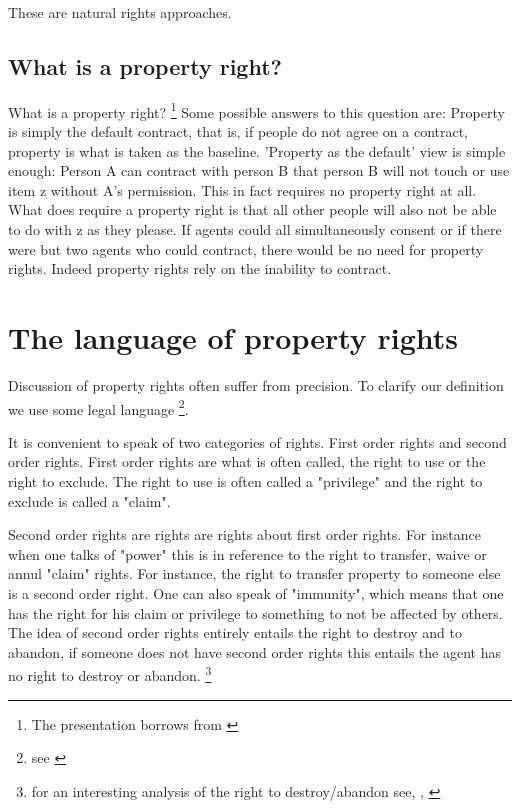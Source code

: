 \documentclass[12pt]{article}
\numberwithin{equation}{section}
\begin{document}
These are natural rights approaches. 

\newpage


\subsection{What is a property right?}

What is a property right? \footnote{The presentation borrows from \cite{Munzer1990}}
Some possible answers to this question are: Property is simply the default contract, that is, if people do not agree on a contract, property is what is taken as the baseline. 'Property as the default' view is simple enough: Person A can contract with person B that person B will not touch or use item z without A's permission. This in fact requires no property right at all. What does require a property right is that all other people will also not be able to do with z as they please. If agents could all simultaneously consent or if there were but two agents who could contract, there would be no need for property rights. Indeed property rights rely on the inability to contract. 



\section{The language of property rights}

Discussion of property rights often suffer from precision. To clarify our definition we use some legal language \footnote{see \cite{Hohfeld}}. 

It is convenient to speak of two categories of rights. First order rights and second order rights. First order rights are what is often called, the right to use or the right to exclude. The right to use is often called a "privilege" and the right to exclude is called a "claim". 

Second order rights are rights are rights about first order rights. For instance when one talks of "power" this is in reference to the right to transfer, waive or annul "claim" rights. For instance, the right to transfer property to someone else is a second order right. One can also speak of "immunity", which means that one has the right for his claim or privilege to something to not be affected by others. 
The idea of second order rights entirely entails the right to destroy and to abandon, if someone does not have second order rights this entails the agent has no right to destroy or abandon. \footnote{for an interesting analysis of the right to destroy/abandon see, \cite{Strahilevitz2005}, \cite{Strahilevitz2009}} 
\end{document}
